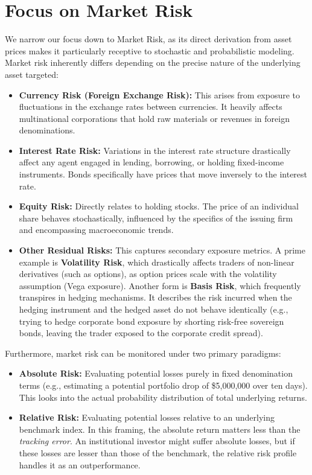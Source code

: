 \section{Focus on Market Risk}

We narrow our focus down to Market Risk, as its direct derivation from asset prices makes it particularly receptive to stochastic and probabilistic modeling. Market risk inherently differs depending on the precise nature of the underlying asset targeted:

\begin{itemize}
    \item \textbf{Currency Risk (Foreign Exchange Risk):} This arises from exposure to fluctuations in the exchange rates between currencies. It heavily affects multinational corporations that hold raw materials or revenues in foreign denominations.
    \item \textbf{Interest Rate Risk:} Variations in the interest rate structure drastically affect any agent engaged in lending, borrowing, or holding fixed-income instruments. Bonds specifically have prices that move inversely to the interest rate.
    \item \textbf{Equity Risk:} Directly relates to holding stocks. The price of an individual share behaves stochastically, influenced by the specifics of the issuing firm and encompassing macroeconomic trends.
    \item \textbf{Other Residual Risks:} This captures secondary exposure metrics. A prime example is \textbf{Volatility Risk}, which drastically affects traders of non-linear derivatives (such as options), as option prices scale with the volatility assumption (Vega exposure). Another form is \textbf{Basis Risk}, which frequently transpires in hedging mechanisms. It describes the risk incurred when the hedging instrument and the hedged asset do not behave identically (e.g., trying to hedge corporate bond exposure by shorting risk-free sovereign bonds, leaving the trader exposed to the corporate credit spread).
\end{itemize}

Furthermore, market risk can be monitored under two primary paradigms:
\begin{itemize}
    \item \textbf{Absolute Risk:} Evaluating potential losses purely in fixed denomination terms (e.g., estimating a potential portfolio drop of \$5,000,000 over ten days). This looks into the actual probability distribution of total underlying returns.
    \item \textbf{Relative Risk:} Evaluating potential losses relative to an underlying benchmark index. In this framing, the absolute return matters less than the \textit{tracking error}. An institutional investor might suffer absolute losses, but if these losses are lesser than those of the benchmark, the relative risk profile handles it as an outperformance.
\end{itemize}

